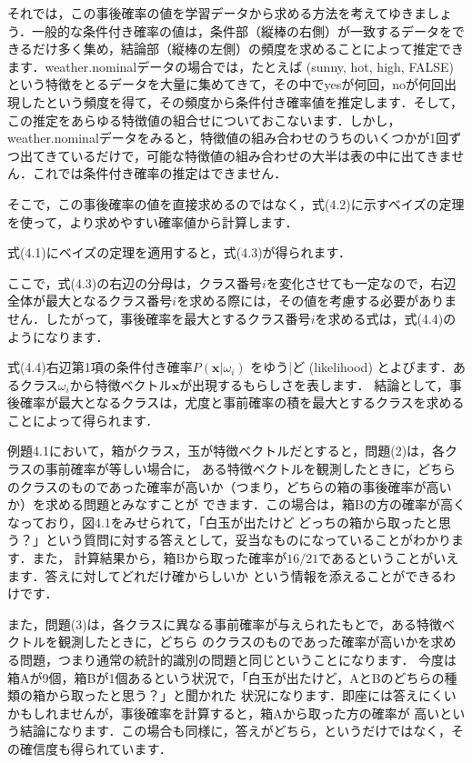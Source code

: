 それでは，この事後確率の値を学習データから求める方法を考えてゆきましょう．一般的な条件付き確率の値は，条件部（縦棒の右側）が一致するデータをできるだけ多く集め，結論部（縦棒の左側）の頻度を求めることによって推定できます．weather.nominalデータの場合では，たとえば (sunny, hot, high, FALSE) という特徴をとるデータを大量に集めてきて，その中でyesが何回，noが何回出現したという頻度を得て，その頻度から条件付き確率値を推定します．そして，この推定をあらゆる特徴値の組合せについておこないます．しかし，weather.nominalデータをみると，特徴値の組み合わせのうちのいくつかが1回ずつ出てきているだけで，可能な特徴値の組み合わせの大半は表の中に出てきません．これでは条件付き確率の推定はできません．

そこで，この事後確率の値を直接求めるのではなく，式(4.2)に示すベイズの定理
を使って，より求めやすい確率値から計算します．


式(4.1)にベイズの定理を適用すると，式(4.3)が得られます．


ここで，式(4.3)の右辺の分母は，クラス番号$i$を変化させても一定なので，右辺全体が最大となるクラス番号$i$を求める際には，その値を考慮する必要がありません．したがって，事後確率を最大とするクラス番号$i$を求める式は，式(4.4)のようになります．



式(4.4)右辺第1項の条件付き確率$P(\bm{x} \vert \omega_i)$
を{ゆう|ど} (likelihood) 
とよびます．あるクラス$\omega_i$から特徴ベクトル$\bm{x}$が出現するもらしさを表します．
結論として，事後確率が最大となるクラスは，尤度と事前確率の積を最大とするクラスを求めることによって得られます．


例題4.1において，箱がクラス，玉が特徴ベクトルだとすると，問題(2)は，各クラスの事前確率が等しい場合に，
ある特徴ベクトルを観測したときに，どちらのクラスのものであった確率が高いか（つまり，どちらの箱の事後確率が高いか）を求める問題とみなすことが
できます．この場合は，箱Bの方の確率が高くなっており，図4.1をみせられて，「白玉が出たけど
どっちの箱から取ったと思う？」という質問に対する答えとして，妥当なものになっていることがわかります．また，
計算結果から，箱Bから取った確率が$16/21$であるということがいえます．答えに対してどれだけ確からしいか
という情報を添えることができるわけです．

また，問題(3)は，各クラスに異なる事前確率が与えられたもとで，ある特徴ベクトルを観測したときに，どちら
のクラスのものであった確率が高いかを求める問題，つまり通常の統計的識別の問題と同じということになります．
今度は箱Aが9個，箱Bが1個あるという状況で，「白玉が出たけど，AとBのどちらの種類の箱から取ったと思う？」と聞かれた
状況になります．即座には答えにくいかもしれませんが，事後確率を計算すると，箱Aから取った方の確率が
高いという結論になります．この場合も同様に，答えがどちら，というだけではなく，その確信度も得られています．


